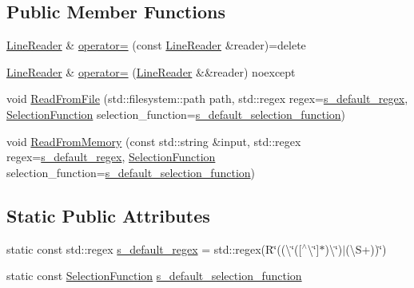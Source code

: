 \subsection*{Public Member Functions}
\begin{DoxyCompactItemize}
\item 
\mbox{\hyperlink{classmage_1_1_line_reader}{Line\+Reader}} \& \mbox{\hyperlink{classmage_1_1_line_reader_a2247078d0b5602f9a9a6b74019832faf}{operator=}} (const \mbox{\hyperlink{classmage_1_1_line_reader}{Line\+Reader}} \&reader)=delete
\item 
\mbox{\hyperlink{classmage_1_1_line_reader}{Line\+Reader}} \& \mbox{\hyperlink{classmage_1_1_line_reader_a3ba691cb32a1ab5dcbe75498068c1b86}{operator=}} (\mbox{\hyperlink{classmage_1_1_line_reader}{Line\+Reader}} \&\&reader) noexcept
\item 
void \mbox{\hyperlink{classmage_1_1_line_reader_aba8857b3d0f49250e312bd737d7d0e9c}{Read\+From\+File}} (std\+::filesystem\+::path path, std\+::regex regex=\mbox{\hyperlink{classmage_1_1_line_reader_a6713da665d123ab39293c0c5a4e8e1de}{s\+\_\+default\+\_\+regex}}, \mbox{\hyperlink{classmage_1_1_line_reader_a17bbae61a3ce30bdb251d6c76e1a4522}{Selection\+Function}} selection\+\_\+function=\mbox{\hyperlink{classmage_1_1_line_reader_a93da10f6f69b44accfec8074712f35de}{s\+\_\+default\+\_\+selection\+\_\+function}})
\item 
void \mbox{\hyperlink{classmage_1_1_line_reader_a6411d017fe1c7f30a544e2f0176f14a2}{Read\+From\+Memory}} (const std\+::string \&input, std\+::regex regex=\mbox{\hyperlink{classmage_1_1_line_reader_a6713da665d123ab39293c0c5a4e8e1de}{s\+\_\+default\+\_\+regex}}, \mbox{\hyperlink{classmage_1_1_line_reader_a17bbae61a3ce30bdb251d6c76e1a4522}{Selection\+Function}} selection\+\_\+function=\mbox{\hyperlink{classmage_1_1_line_reader_a93da10f6f69b44accfec8074712f35de}{s\+\_\+default\+\_\+selection\+\_\+function}})
\end{DoxyCompactItemize}
\subsection*{Static Public Attributes}
\begin{DoxyCompactItemize}
\item 
static const std\+::regex \mbox{\hyperlink{classmage_1_1_line_reader_a6713da665d123ab39293c0c5a4e8e1de}{s\+\_\+default\+\_\+regex}} = std\+::regex(R\char`\"{}((\textbackslash{}\char`\"{}(\mbox{[}$^\wedge$\textbackslash{}\char`\"{}\mbox{]}$\ast$)\textbackslash{}\char`\"{})$\vert$(\textbackslash{}S+))\char`\"{})
\item 
static const \mbox{\hyperlink{classmage_1_1_line_reader_a17bbae61a3ce30bdb251d6c76e1a4522}{Selection\+Function}} \mbox{\hyperlink{classmage_1_1_line_reader_a93da10f6f69b44accfec8074712f35de}{s\+\_\+default\+\_\+selection\+\_\+function}}
\end{DoxyCompactItemize}
